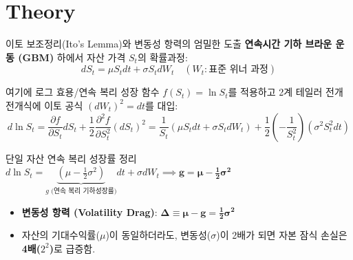 \section{Theory}

\begin{frame}{이토 보조정리(Ito's Lemma)와 변동성 항력의 엄밀한 도출}
\textbf{연속시간 기하 브라운 운동 (GBM)} 하에서 자산 가격 $S_t$의 확률과정:
\begin{equation*}
  dS_t = \mu S_t dt + \sigma S_t dW_t \quad (W_t: \text{표준 위너 과정})
\end{equation*}

여기에 로그 효용/연속 복리 성장 함수 $f(S_t) = \ln S_t$를 적용하고 2계 테일러 전개 전개식에 이토 공식 $(dW_t)^2 = dt$를 대입:
\begin{equation*}
  d\ln S_t = \frac{\partial f}{\partial S_t} dS_t + \frac{1}{2} \frac{\partial^2 f}{\partial S_t^2} (dS_t)^2 = \frac{1}{S_t}(\mu S_t dt + \sigma S_t dW_t) + \frac{1}{2}\left(-\frac{1}{S_t^2}\right)(\sigma^2 S_t^2 dt)
\end{equation*}

\vspace{1mm}
\begin{block}{단일 자산 연속 복리 성장률 정리}
  \centering
  \large
  $d\ln S_t = \underbrace{\left( \mu - \frac{1}{2}\sigma^2 \right)}_{g \text{ (연속 복리 기하성장률)}} dt + \sigma dW_t \implies \mathbf{g = \mu - \frac{1}{2}\sigma^2}$
\end{block}

\vspace{1mm}
\begin{itemize}
  \small
  \item \textbf{변동성 항력 (Volatility Drag)}: $\boldsymbol{\Delta \equiv \mu - g = \frac{1}{2}\sigma^2}$
  \item 자산의 기대수익률($\mu$)이 동일하더라도, 변동성($\sigma$)이 2배가 되면 자본 잠식 손실은 \textbf{4배($2^2$)}로 급증함.
\end{itemize}
\end{frame}

